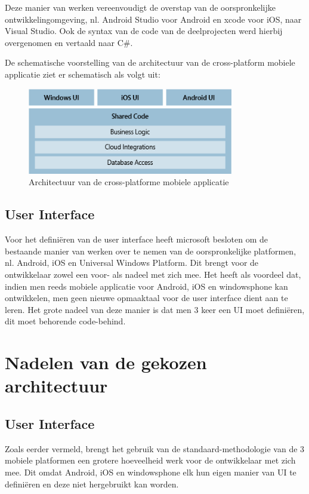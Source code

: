 Deze manier van werken vereenvoudigt de overstap van de oorspronkelijke ontwikkelingomgeving, nl. Android Studio voor Android en xcode voor iOS, naar Visual Studio.
Ook de syntax van de code van de deelprojecten werd hierbij overgenomen en vertaald naar C\#.

De schematische voorstelling van de architectuur van de cross-platform mobiele applicatie ziet er schematisch als volgt uit:
\begin{figure}[ht!]
\centering
\caption{Architectuur van de cross-platforme mobiele applicatie}
\includegraphics[width=90mm]{./img/architecture.png}
\end{figure}

\subsection{User Interface}
Voor het definiëren van de user interface heeft microsoft besloten om de bestaande manier van werken over te nemen van de oorspronkelijke platformen, nl. Android, iOS en Universal Windows Platform.
Dit brengt voor de ontwikkelaar zowel een voor- als nadeel met zich mee. Het heeft als voordeel dat, indien men reeds mobiele applicatie voor Android, iOS en windowsphone kan ontwikkelen, men geen
nieuwe opmaaktaal voor de user interface dient aan te leren. Het grote nadeel van deze manier is dat men 3 keer een UI moet definiëren,
dit moet behorende code-behind.

\label{sec:nadelenvandegekozenapparchitectuur}
\section{Nadelen van de gekozen architectuur}
\subsection{User Interface}
Zoals eerder vermeld, brengt het gebruik van de standaard-methodologie van de 3 mobiele platformen een grotere hoeveelheid
werk voor de ontwikkelaar met zich mee. Dit omdat Android, iOS en windowsphone elk hun eigen manier van UI te definiëren en deze niet hergebruikt kan worden.

